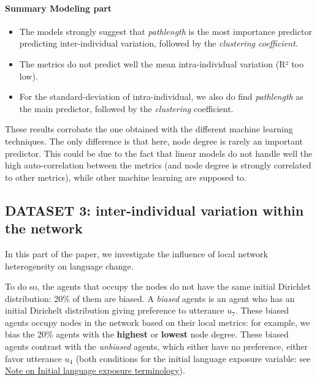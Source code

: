 \documentclass[
]{article}
\begin{document}
\hypertarget{summary-modeling-part}{%
\paragraph{Summary Modeling part}\label{summary-modeling-part}}

\begin{itemize}
\item
  The models strongly suggest that \emph{pathlength} is the most
  importance predictor predicting inter-individual variation, followed
  by the \emph{clustering coefficient}.
\item
  The metrics do not predict well the mean intra-individual variation
  (R² too low).
\item
  For the standard-deviation of intra-individual, we also do find
  \emph{pathlength} as the main predictor, followed by the
  \emph{clustering} coefficient.
\end{itemize}

These results corrobate the one obtained with the different machine
learning techniques. The only difference is that here, node degree is
rarely an important predictor. This could be due to the fact that linear
models do not handle well the high auto-correlation between the metrics
(and node degree is strongly correlated to other metrics), while other
machine learning are supposed to.

\hypertarget{dataset-3-inter-individual-variation-within-the-network}{%
\subsection{DATASET 3: inter-individual variation within the
network}\label{dataset-3-inter-individual-variation-within-the-network}}

In this part of the paper, we investigate the influence of local network
heterogeneity on language change.

To do so, the agents that occupy the nodes do not have the same initial
Dirichlet distribution: 20\% of them are biased. A \emph{biased} agents
is an agent who has an initial Dirichelt distribution giving preference
to utterance \(u_7\). These biased agents occupy nodes in the network
based on their local metrics: for example, we bias the 20\% agents with
the \textbf{highest} or \textbf{lowest} node degree. These biased agents
contrast with the \emph{unbiased} agents, which either have no
preference, either favor utterance \(u_4\) (both conditions for the
initial language exposure variable: see
\protect\hyperlink{note-on-initial-language-exposure-terminology}{Note
on Initial language exposure terminology}).
\end{document}
